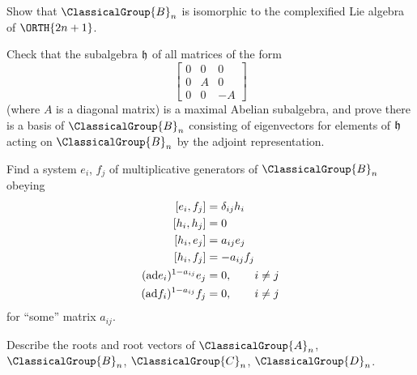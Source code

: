 \begin{exercise}
Show that $\ClassicalGroup{B}_{n}$ is isomorphic to the complexified Lie algebra of $\ORTH{2n+1}$.
\end{exercise}
\begin{exercise}
Check that the subalgebra $\frak{h}$ of all matrices of the form
\begin{equation}
\begin{bmatrix}0&0&0\\
0&A&0\\
0&0&-A
\end{bmatrix}
\end{equation}
(where $A$ is a diagonal matrix) is a maximal Abelian subalgebra,
and prove there is a basis of $\ClassicalGroup{B}_{n}$ consisting of eigenvectors
for elements of $\frak{h}$ acting on $\ClassicalGroup{B}_{n}$ by the adjoint
representation.
\end{exercise}
\begin{exercise}
Find a system $e_{i}$, $f_{j}$ of multiplicative generators of
$\ClassicalGroup{B}_{n}$ obeying
\begin{subequations}
\begin{align}
[e_{i},f_{j}]&=\delta_{ij}h_{i}\\
[h_{i},h_{j}]&=0\\
[h_{i},e_{j}]&=a_{ij}e_{j}\\
[h_{i},f_{j}]&=-a_{ij}f_{j}\\
({\rm ad}e_{i})^{1-a_{ij}}e_{j}&=0,\qquad i\not=j\\
({\rm ad}f_{i})^{1-a_{ij}}f_{j}&=0,\qquad i\not=j
\end{align}
\end{subequations}
for ``some'' matrix $a_{ij}$.
\end{exercise}
\begin{exercise}
Describe the roots and root vectors of $\ClassicalGroup{A}_{n}$, $\ClassicalGroup{B}_{n}$, $\ClassicalGroup{C}_{n}$, $\ClassicalGroup{D}_{n}$.
\end{exercise}
